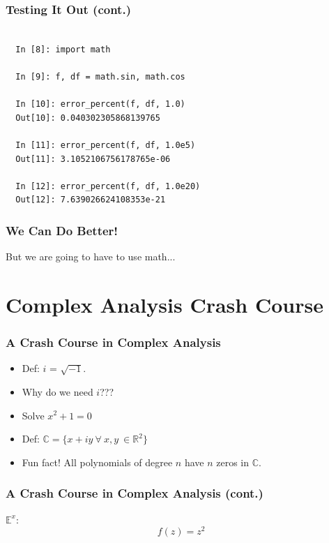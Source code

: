 \documentclass{beamer}
\def\R{\mathbb{R}}                     %
\def\C{\mathbb{C}}                     %
\begin{document}
\begin{frame}[fragile]
\frametitle{Testing It Out (cont.)}

\begin{lstlisting}

  In [8]: import math

  In [9]: f, df = math.sin, math.cos

  In [10]: error_percent(f, df, 1.0)
  Out[10]: 0.040302305868139765

  In [11]: error_percent(f, df, 1.0e5)
  Out[11]: 3.1052106756178765e-06

  In [12]: error_percent(f, df, 1.0e20)
  Out[12]: 7.639026624108353e-21

\end{lstlisting}

\end{frame}

\begin{frame}
\frametitle{We Can Do Better!}

But we are going to have to use math...
\end{frame}


\section{Complex Analysis Crash Course}

\begin{frame}
\frametitle{A Crash Course in Complex Analysis}

\begin{itemize}[<+->]
  \item Def: $i$ = $\sqrt{-1}$.
  \item Why do we need $i$???
  \item Solve $x^2 + 1 = 0$
  \item Def: $\C = \{x + iy \ \forall \ x,y \ \in \R^2 \}$
  \item Fun fact! All polynomials of degree $n$ have $n$ zeros in $\C$.
\end{itemize}


\end{frame}

\begin{frame}
\frametitle{A Crash Course in Complex Analysis (cont.)}

$\mathbb{E}^x$:
\[ f(z) = z^2 \]
\pause {}

\pause {}
\pause {}
\end{frame}
\end{document}

